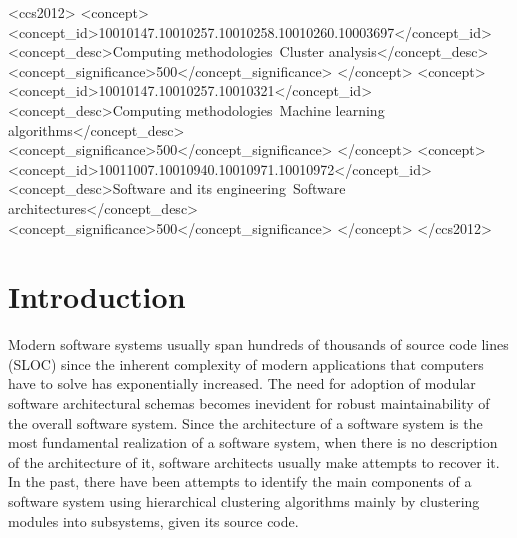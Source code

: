 \documentclass[sigconf,review, anonymous]{acmart}
\begin{document}
%
%
\begin{CCSXML}
<ccs2012>
<concept>
<concept_id>10010147.10010257.10010258.10010260.10003697</concept_id>
<concept_desc>Computing methodologies~Cluster analysis</concept_desc>
<concept_significance>500</concept_significance>
</concept>
<concept>
<concept_id>10010147.10010257.10010321</concept_id>
<concept_desc>Computing methodologies~Machine learning algorithms</concept_desc>
<concept_significance>500</concept_significance>
</concept>
<concept>
<concept_id>10011007.10010940.10010971.10010972</concept_id>
<concept_desc>Software and its engineering~Software architectures</concept_desc>
<concept_significance>500</concept_significance>
</concept>
</ccs2012>
\end{CCSXML}

%



\maketitle

\section{Introduction}



Modern software systems usually span hundreds of thousands of source code lines (SLOC) 
since the inherent complexity of modern applications that computers have to solve has 
exponentially increased. The need for adoption of modular software architectural schemas 
becomes inevident for robust maintainability of the overall software system.
Since the architecture of a software system is the most fundamental realization of a 
software system, when there is no description of the architecture of it, software 
architects usually make attempts to recover it. In the past, there have been attempts to 
identify the main components of a software system using hierarchical clustering 
algorithms \cite{maqbool_overview} mainly by clustering modules into subsystems, given 
its source code.    
\end{document}
